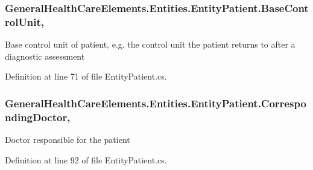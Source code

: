 \subsubsection[{\texorpdfstring{Base\+Control\+Unit}{BaseControlUnit}}]{ General\+Health\+Care\+Elements.\+Entities.\+Entity\+Patient.\+Base\+Control\+Unit\hspace{0.3cm}{\ttfamily [get]}, {\ttfamily [set]}}\hypertarget{class_general_health_care_elements_1_1_entities_1_1_entity_patient_aa7d6384fe47d43da9f0007005104ad28}{}\label{class_general_health_care_elements_1_1_entities_1_1_entity_patient_aa7d6384fe47d43da9f0007005104ad28}


Base control unit of patient, e.\+g. the control unit the patient returns to after a diagnostic assessment 



Definition at line 71 of file Entity\+Patient.\+cs.

\subsubsection[{\texorpdfstring{Corresponding\+Doctor}{CorrespondingDoctor}}]{ General\+Health\+Care\+Elements.\+Entities.\+Entity\+Patient.\+Corresponding\+Doctor\hspace{0.3cm}{\ttfamily [get]}, {\ttfamily [set]}}\hypertarget{class_general_health_care_elements_1_1_entities_1_1_entity_patient_a04cc668cc62e68b45abc0d84730de340}{}\label{class_general_health_care_elements_1_1_entities_1_1_entity_patient_a04cc668cc62e68b45abc0d84730de340}


Doctor responsible for the patient 



Definition at line 92 of file Entity\+Patient.\+cs.

